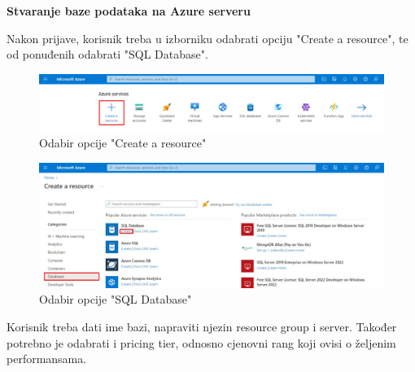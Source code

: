 		\noindent\textbf{Stvaranje baze podataka na Azure serveru}

		\noindent Nakon prijave, korisnik treba u izborniku odabrati opciju "Create a resource", te od ponuđenih odabrati "SQL Database".

		\vspace{10mm}
	
		\begin{figure}[H]
			 \includegraphics[width=\linewidth]{./slike/baza0.jpg}
			  \centering
			  \caption{Odabir opcije "Create a resource"}
		  \end{figure}

		\vspace{20mm}
		
	
		\begin{figure}[H]
			 \includegraphics[width=\linewidth]{./slike/baza1.jpg}
			  \centering
			  \caption{Odabir opcije "SQL Database"}
		  \end{figure}
		  
	
	\vspace{25mm}

	   \noindent Korisnik treba dati ime bazi, napraviti njezin resource group i server. Također potrebno je odabrati i pricing tier, odnosno cjenovni rang koji ovisi o željenim performansama.
	
		\vspace{10mm}

